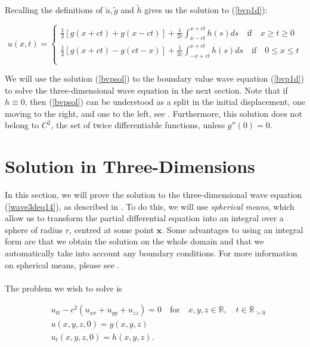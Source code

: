\documentclass[a4paper, 12pt]{article}
\numberwithin{equation}{section}
\begin{document}
Recalling the definitions of $\tilde{u}, \tilde{g}$ and $\tilde{h}$ gives us the
solution to (\ref{bvp1d}):

\begin{equation} \label{bvpsol}
    u(x,t)=
    \begin{cases}
        \frac{1}{2}\left[g(x+ct)+g(x-ct)\right]+\frac{1}{2c}\int^{x+ct}_{x-ct}h(s)ds \quad \textrm{if} \quad x \ge t \ge 0\\
        \frac{1}{2}\left[g(x+ct)-g(ct-x)\right]+\frac{1}{2c}\int^{x+ct}_{-x+ct}h(s)ds \quad \textrm{if} \quad 0 \le x \le t\\
    \end{cases}
\end{equation}

We will use the solution (\ref{bvpsol}) to the boundary value wave equation
(\ref{bvp1d}) to solve the three-dimensional wave equation in the next section.
Note that if $h \equiv 0$, then (\ref{bvpsol}) can be understood as a split in
the initial displacement, one moving to the right, and one to the left, see
\cite{Ev}. Furthermore, this solution does not belong to $C^2$, the set of twice
differentiable functions, unless $g''(0)=0$.

\section{Solution in Three-Dimensions} \label{sec3d}
In this section, we will prove the solution to the three-dimensional wave
equation (\ref{wave3deq14}), as described in \cite[Chap. 2.4]{Ev}. To do this,
we will use \emph{spherical means}, which allow us to transform the partial
differential equation into an integral over a sphere of radius $r$, centred at
some point $\boldsymbol{x}$. Some advantages to using an integral form are that
we obtain the solution on the whole domain and that we automatically take into
account any boundary conditions. For more information on spherical means, please
see \cite{Sab}. \\
\\

The problem we wish to solve is

\begin{equation} \label{3deq}
\begin{aligned}
    &u_{tt}-c^2(u_{xx}+u_{yy}+u_{zz})=0 \quad \textrm {for} \quad x, y, z \in \mathbb{R}, \quad t \in \mathbb{R}_{>0}\\
    &u(x, y, z,0)=g(x,y,z)\\
    &u_t(x,y,z,0)=h(x,y,z).\\
\end{aligned}
\end{equation}
\end{document}
